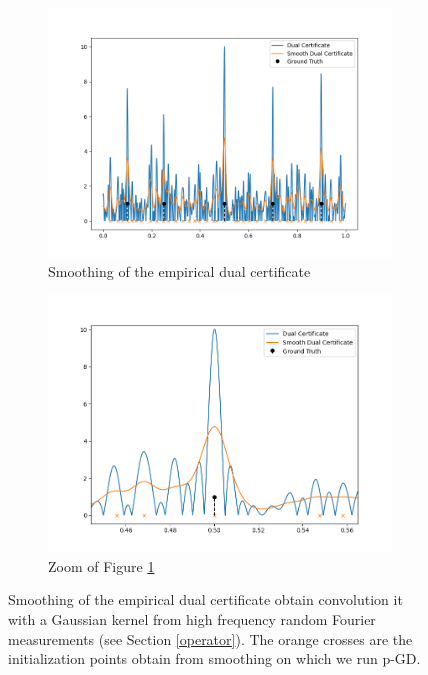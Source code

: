 \documentclass[a4paper,12pt,oneside]{report}
\theoremstyle{named}
\begin{document}
\begin{figure}
\centering
\begin{subfigure}[b]{0.8\textwidth}
   \includegraphics[width=1\linewidth]{smoothing.png}
   \caption{Smoothing of the empirical dual certificate}
   \label{fig:smoothing} 
\end{subfigure}

\begin{subfigure}[b]{0.8\textwidth}
   \includegraphics[width=1\linewidth]{smoothing_zoom.png}
   \caption{Zoom of Figure \ref{fig:smoothing}}
   \label{fig:smoothing_zoom} 
\end{subfigure}
\caption{Smoothing of the empirical dual certificate obtain convolution it with a Gaussian kernel from high frequency random Fourier measurements (see Section \ref{operator}). The orange crosses are the initialization points obtain from smoothing on which we run p-GD.}
\label{fig:smoothing_}
\end{figure}
\end{document}
